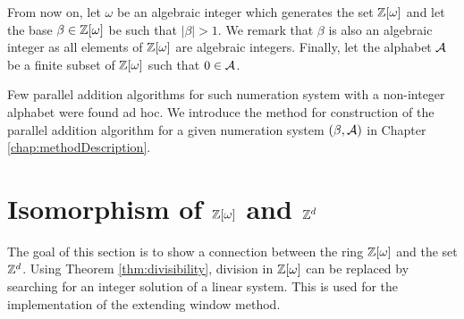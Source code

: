 From now on, let $\omega$ be an algebraic integer  which generates the set $\mathbb{Z}[\omega]$ and let the base $\beta\in\mathbb{Z}[\omega]$ be such that $|\beta|>1$. We remark that $\beta$ is also an algebraic integer as all elements of $\mathbb{Z}[\omega]$ are algebraic integers. Finally, let the alphabet $\mathcal{A}$ be a finite subset of $\mathbb{Z}[\omega]$ such that $0\in\mathcal{A}$.

Few parallel addition algorithms for such numeration system with a non-integer alphabet were found ad hoc. We introduce the method for construction of the parallel addition algorithm for a given numeration system $(\beta,\mathcal{A})$ in Chapter \ref{chap:methodDescription}. 
  


\section{\texorpdfstring{Isomorphism of $\mathbb{Z}[\omega]$ and $\mathbb{Z}^{d}$}{Isomorphism of Z[omega] and Zd}}
The goal of this section is to show a connection between the ring $\mathbb{Z}[\omega]$ and the set $\mathbb{Z}^d$. Using Theorem \ref{thm:divisibility}, division in $\mathbb{Z}[\omega]$ can be replaced by searching for an integer solution of a linear system. This is used for the implementation of the extending window method.

